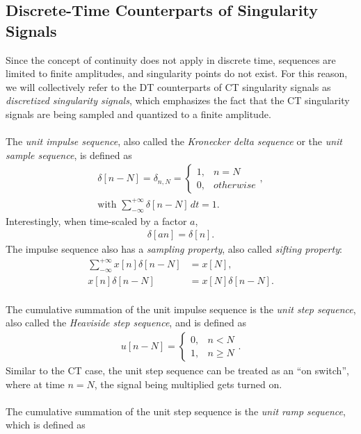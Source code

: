 \documentclass{report}
\begin{document}
\subsection{Discrete-Time Counterparts of Singularity Signals}
Since the concept of continuity does not apply in discrete time, sequences are limited to finite amplitudes, and singularity points do not exist. 
For this reason, we will collectively refer to the DT counterparts of CT singularity signals as \emph{discretized singularity signals}, which 
emphasizes the fact that the CT singularity signals are being sampled and quantized to a finite amplitude.
\\ \\
The \emph{unit impulse sequence}, also called the \emph{Kronecker delta sequence} or the \emph{unit sample sequence}, is defined as 
\begin{align}
    \delta[n-N] = \delta_{n,N} =
    \begin{cases} 
        1, & n=N \\
        0, & otherwise
    \end{cases}, \\
    \text{with } \sum_{-\infty}^{+\infty} \delta[n-N] \,dt = 1.
\end{align}
Interestingly, when time-scaled by a factor $a$,
\begin{align}
    \delta[an] = \delta[n].
\end{align}
The impulse sequence also has a \emph{sampling property}, also called \emph{sifting property}:
\begin{align}
    \sum_{-\infty}^{+\infty} x[n]\delta[n-N]&= x[N], \\
    x[n]\delta[n-N] &= x[N]\delta[n-N].
\end{align} \\
The cumulative summation of the unit impulse sequence is the \emph{unit step sequence}, also called the \emph{Heaviside step sequence}, and is defined as 
\begin{align}
    u[n-N] = 
    \begin{cases} 
        0, & n<N \\
        1, & n\geq N
    \end{cases}.
\end{align}
Similar to the CT case, the unit step sequence can be treated as an ``on switch'', where at time $n=N$, the signal being multiplied gets turned on. 
\\ \\
The cumulative summation of the unit step sequence is the \emph{unit ramp sequence}, which is defined as
\end{document}

